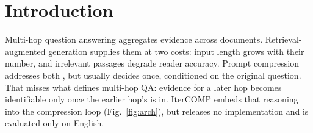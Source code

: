 \documentclass[runningheads]{llncs}
\begin{document}
\section{Introduction}
Multi-hop question answering aggregates evidence across documents.
Retrieval-augmented generation \cite{lewis2020rag} supplies them at two costs:
input length grows with their number, and irrelevant passages degrade reader
accuracy. Prompt compression addresses both
\cite{jiang2023llmlingua,li2023selectivecontext,pan2024llmlingua2,xu2024recomp},
but usually decides once, conditioned on the original question. That misses what
defines multi-hop QA: evidence for a later hop becomes identifiable only once the
earlier hop's is in. IterCOMP \cite{yun2026itercomp} embeds that reasoning into
the compression loop (Fig.~\ref{fig:arch}), but releases no implementation and
is evaluated only on English.
\end{document}
